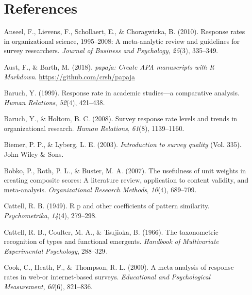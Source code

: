 \documentclass[
  man,mask]{apa7}
\newlength{\cslhangindent}
\newenvironment{CSLReferences}[2] %
 {\begin{list}{}{%
  \setlength{\itemindent}{0pt}
  \setlength{\leftmargin}{0pt}
  \setlength{\parsep}{0pt}
  \ifodd #1
   \setlength{\leftmargin}{\cslhangindent}
   \setlength{\itemindent}{-1\cslhangindent}
  \fi
  \setlength{\itemsep}{#2\baselineskip}}}
 {\end{list}}
\begin{document}
\newpage

\section{References}\label{references}

\begingroup
\setlength{\parindent}{-0.5in}
\setlength{\leftskip}{0.5in}

\label{refs}
\begin{CSLReferences}{1}{0}
Anseel, F., Lievens, F., Schollaert, E., \& Choragwicka, B. (2010). Response rates in organizational science, 1995--2008: A meta-analytic review and guidelines for survey researchers. \emph{Journal of Business and Psychology}, \emph{25}(3), 335--349.

Aust, F., \& Barth, M. (2018). \emph{{papaja}: {Create} {APA} manuscripts with {R Markdown}}. \url{https://github.com/crsh/papaja}

Baruch, Y. (1999). Response rate in academic studies---a comparative analysis. \emph{Human Relations}, \emph{52}(4), 421--438.

Baruch, Y., \& Holtom, B. C. (2008). Survey response rate levels and trends in organizational research. \emph{Human Relations}, \emph{61}(8), 1139--1160.

Biemer, P. P., \& Lyberg, L. E. (2003). \emph{Introduction to survey quality} (Vol. 335). John Wiley \& Sons.

Bobko, P., Roth, P. L., \& Buster, M. A. (2007). The usefulness of unit weights in creating composite scores: A literature review, application to content validity, and meta-analysis. \emph{Organizational Research Methods}, \emph{10}(4), 689--709.

Cattell, R. B. (1949). R p and other coefficients of pattern similarity. \emph{Psychometrika}, \emph{14}(4), 279--298.

Cattell, R. B., Coulter, M. A., \& Tsujioka, B. (1966). The taxonometric recognition of types and functional emergents. \emph{Handbook of Multivariate Experimental Psychology}, 288--329.

Cook, C., Heath, F., \& Thompson, R. L. (2000). A meta-analysis of response rates in web-or internet-based surveys. \emph{Educational and Psychological Measurement}, \emph{60}(6), 821--836.


\end{CSLReferences}
\end{document}
